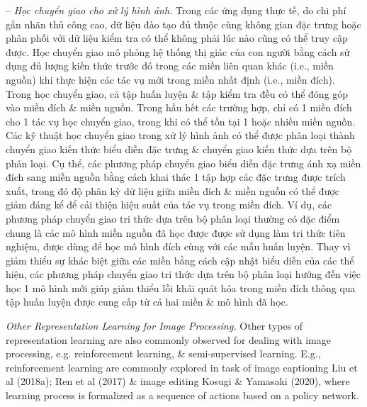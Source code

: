 \documentclass{article}
\begin{document}
\begin{itemize}
\begin{itemize}
\begin{itemize}
            -- {\it Học chuyển giao cho xử lý hình ảnh.} Trong các ứng dụng thực tế, do chi phí gắn nhãn thủ công cao, dữ liệu đào tạo đủ thuộc cùng không gian đặc trưng hoặc phân phối với dữ liệu kiểm tra có thể không phải lúc nào cũng có thể truy cập được. Học chuyển giao mô phỏng hệ thống thị giác của con người bằng cách sử dụng đủ lượng kiến thức trước đó trong các miền liên quan khác (i.e., miền nguồn) khi thực hiện các tác vụ mới trong miền nhất định (i.e., miền đích). Trong học chuyển giao, cả tập huấn luyện \& tập kiểm tra đều có thể đóng góp vào miền đích \& miền nguồn. Trong hầu hết các trường hợp, chỉ có 1 miền đích cho 1 tác vụ học chuyển giao, trong khi có thể tồn tại 1 hoặc nhiều miền nguồn. Các kỹ thuật học chuyển giao trong xử lý hình ảnh có thể được phân loại thành chuyển giao kiến thức biểu diễn đặc trưng \& chuyển giao kiến thức dựa trên bộ phân loại. Cụ thể, các phương pháp chuyển giao biểu diễn đặc trưng ánh xạ miền đích sang miền nguồn bằng cách khai thác 1 tập hợp các đặc trưng được trích xuất, trong đó độ phân kỳ dữ liệu giữa miền đích \& miền nguồn có thể được giảm đáng kể để cải thiện hiệu suất của tác vụ trong miền đích. Ví dụ, các phương pháp chuyển giao tri thức dựa trên bộ phân loại thường có đặc điểm chung là các mô hình miền nguồn đã học được được sử dụng làm tri thức tiên nghiệm, được dùng để học mô hình đích cùng với các mẫu huấn luyện. Thay vì giảm thiểu sự khác biệt giữa các miền bằng cách cập nhật biểu diễn của các thể hiện, các phương pháp chuyển giao tri thức dựa trên bộ phân loại hướng đến việc học 1 mô hình mới giúp giảm thiểu lỗi khái quát hóa trong miền đích thông qua tập huấn luyện được cung cấp từ cả hai miền \& mô hình đã học.

            {\it Other Representation Learning for Image Processing.} Other types of representation learning are also commonly observed for dealing with image processing, e.g. reinforcement learning, \& semi-supervised learning. E.g., reinforcement learning are commonly explored in task of image captioning Liu et al (2018a); Ren et al (2017) \& image editing Kosugi \& Yamasaki (2020), where learning process is formalized as a sequence of actions based on a policy network.


\end{itemize}
\end{itemize}
\end{itemize}
\end{document}
